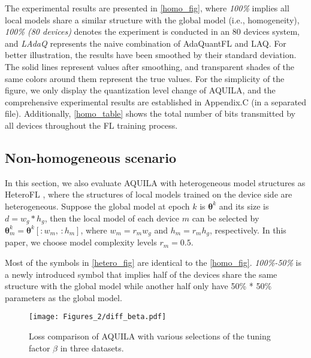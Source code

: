\documentclass[lettersize,journal]{IEEEtran}
\begin{document}
The experimental results are presented in \cref{homo_fig}, where \textit{100\%} implies all local models share a similar structure with the global model (i.e., homogeneity), \textit{100\% (80 devices)} denotes the experiment is conducted in an 80 devices system, and \textit{LAdaQ} represents the naive combination of AdaQuantFL and LAQ. For better illustration, the results have been smoothed by their standard deviation. The solid lines represent values after smoothing, and transparent shades of the same colors around them represent the true values. For the simplicity of the figure, we only display the quantization level change of AQUILA, and the comprehensive experimental results are established in Appendix.C (in a separated file). Additionally, \cref{homo_table} shows the total number of bits transmitted by all devices throughout the FL training process. 



\subsection{Non-homogeneous scenario}
In this section, we also evaluate AQUILA with heterogeneous model structures as HeteroFL \cite{diao2020heterofl}, where the structures of local models trained on the device side are heterogeneous. Suppose the global model at epoch $k$ is $\boldsymbol{\theta}^{k}$ and its size is $d = w_g * h_g$, then the local model of each device $m$ can be selected by $\boldsymbol{\theta}_{m}^{k} = \boldsymbol{\theta}^{k}\left[: w_{m},\,: h_{m}\right]$, where $w_{m} = r_{m} w_{g}$ and $h_{m} = r_{m} h_{g}$, respectively. In this paper, we choose model complexity levels $r_m = 0.5$.


Most of the symbols in \cref{hetero_fig} are identical to the \cref{homo_fig}. \textit{100\%-50\%} is a newly introduced symbol that implies half of the devices share the same structure with the global model while another half only have 50\% * 50\% parameters as the global model.


\begin{figure*}[htbp]
    \centering
    \texttt{[image: Figures\_2/diff\_beta.pdf]}
    \vspace{-8pt}
    \caption{Loss comparison of AQUILA with various selections of the tuning factor $\beta$ in three datasets.}
    \label{diff_beta}
    \vspace{-12pt}
\end{figure*}
\end{document}
